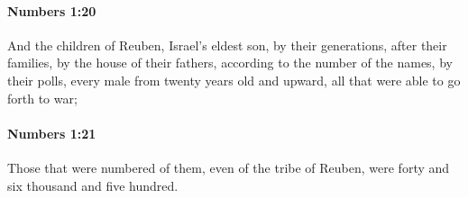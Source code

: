		\paragraph{Numbers 1:20} %
			\label{NUMBERS-1-20}

			And the children of Reuben, Israel’s eldest son, by their generations, after their families, by the house of their fathers, according to the number of the names, by their polls, every male from twenty years old and upward, all that were able to go forth to war;


		\paragraph{Numbers 1:21} %
			\label{NUMBERS-1-21}

			Those that were numbered of them, even of the tribe of Reuben, were forty and six thousand and five hundred.


